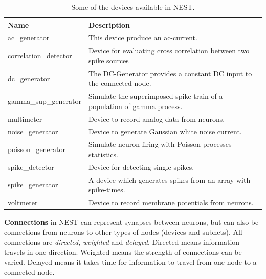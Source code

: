 \begin{table}
\begin{tabularx}{\textwidth}{| l | X |}
\hline
\bf{Name} & \bf{Description} \\ \hline
ac\_generator & This device produce an ac-current. \\ \hline
correlation\_detector & Device for evaluating cross correlation between two spike sources \\ \hline
dc\_generator & The DC-Generator provides a constant DC input to the connected node. \\ \hline
gamma\_sup\_generator & Simulate the superimposed spike train of a population of gamma process. \\ \hline
multimeter & Device to record analog data from neurons. \\ \hline
noise\_generator & Device to generate Gaussian white noise current. \\ \hline
poisson\_generator & Simulate neuron firing with Poisson processes statistics. \\ \hline
spike\_detector & Device for detecting single spikes. \\ \hline
spike\_generator & A device which generates spikes from an array with spike-times. \\ \hline
voltmeter & Device to record membrane potentials from neurons. \\ \hline
\end{tabularx}
\caption[Devices in NEST]{Some of the devices available in NEST.}
\label{tab:dev_mod}
\end{table}

{\bf Connections} in NEST can represent synapses between neurons, but can also be connections from neurons to other types of nodes (devices and subnets). All connections are \emph{directed}, \emph{weighted} and \emph{delayed}. Directed means information travels in one direction. Weighted means the strength of connections can be varied. Delayed means it takes time for information to travel from one node to a connected node.

